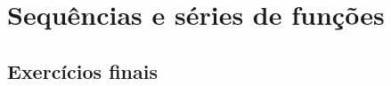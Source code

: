 
\chapter{Sequências e séries de funções}\label{cap:sequencias_e_series_de_funcoes}

\emconstrucao

\section{Exercícios finais}

\construirExer